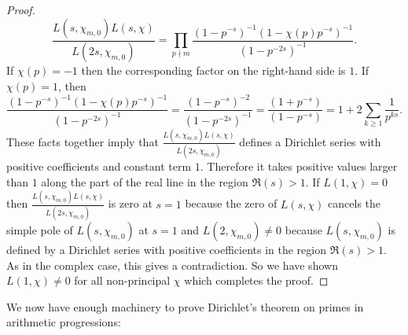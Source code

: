 \begin{proof}
        \[
          \frac{L(s,\chi_{m,0})L(s,\chi)}{L(2s,\chi_{m,0})} = \prod_{p \nmid m}\frac{(1-p^{-s})^{-1}(1-\chi(p)p^{-s})^{-1}}{(1-p^{-2s})^{-1}}.
        \]
        If $\chi(p) = -1$ then the corresponding factor on the right-hand side is $1$. If $\chi(p) = 1$, then
        \[
          \frac{(1-p^{-s})^{-1}(1-\chi(p)p^{-s})^{-1}}{(1-p^{-2s})^{-1}} = \frac{(1-p^{-s})^{-2}}{(1-p^{-2s})^{-1}} = \frac{(1+p^{-s})}{(1-p^{-s})} = 1+2\sum_{k \ge 1}\frac{1}{p^{ks}}.
        \]
        These facts together imply that $\frac{L(s,\chi_{m,0})L(s,\chi)}{L(2s,\chi_{m,0})}$ defines a Dirichlet series with positive coefficients and constant term $1$. Therefore it takes positive values larger than $1$ along the part of the real line in the region $\Re(s) > 1$. If $L(1,\chi) = 0$ then $\frac{L(s,\chi_{m,0})L(s,\chi)}{L(2s,\chi_{m,0})}$ is zero at $s = 1$ because the zero of $L(s,\chi)$ cancels the simple pole of $L(s,\chi_{m,0})$ at $s = 1$ and $L(2,\chi_{m,0}) \neq 0$ because $L(s,\chi_{m,0})$ is defined by a Dirichlet series with positive coefficients in the region $\Re(s) > 1$. As in the complex case, this gives a contradiction. So we have shown $L(1,\chi) \neq 0$ for all non-principal $\chi$ which completes the proof.
      \end{proof}

      We now have enough machinery to prove Dirichlet's theorem on primes in arithmetic progressions:

